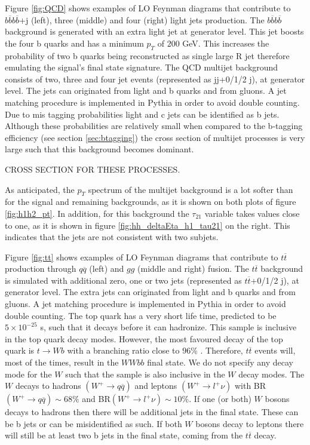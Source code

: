Figure \ref{fig:QCD} shows examples of LO Feynman diagrams that contribute to $b\overline{b}b\overline{b}$+j (left), three (middle) and four (right) light jets production. The $b\overline{b}b\overline{b}$ background is generated with an extra light jet at generator level. This jet boosts the four b quarks and has a minimum $p_T$ of $200$ GeV. This increases the probability of two b quarks being reconstructed as single large R jet therefore emulating the signal's final state signature. The QCD multijet background consists of two, three and four jet events (represented as jj+0/1/2 j), at generator level. The jets can originated from light and b quarks and from gluons. A jet matching procedure is implemented in Pythia in order to avoid double counting. Due to mis tagging probabilities light and c jets can be identified as b jets. Although these probabilities are relatively small when compared to the b-tagging efficiency (see section \ref{sec:btagging}) the cross section of multijet processes is very large such that this background becomes dominant.

CROSS SECTION FOR THESE PROCESSES.

As anticipated, the $p_T$ spectrum of the multijet background is a lot softer than for the signal and remaining backgrounds, as it is shown on both plots of figure \ref{fig:h1h2_pt}. In addition, for this background the $\tau_{21}$ variable takes values close to one, as it is shown in figure \ref{fig:hh_deltaEta_h1_tau21} on the right. This indicates that the jets are not consistent with two subjets. 

Figure \ref{fig:tt} shows examples of LO Feynman diagrams that contribute to $t\overline{t}$ production through $q\overline{q}$ (left) and $gg$ (middle and right) fusion. The $t\overline{t}$ background is simulated with additional zero, one or two jets (represented as $t\overline{t}$+0/1/2 j), at generator level. The extra jets can originated from light and b quarks and from gluons. A jet matching procedure is implemented in Pythia in order to avoid double counting. The top quark has a very short life time, predicted to be $5\times 10^{-25}$ s, such that it decays before it can hadronize. This sample is inclusive in the top quark decay modes. However, the most favoured decay of the top quark is $t\rightarrow Wb$ with a branching ratio close to $96\%$ \cite{PDG2016}. Therefore, $t\overline{t}$ events will, most of the times, result in the $WWbb$ final state. We do not specify any decay mode for the $W$ such that the sample is also inclusive in the $W$ decay modes. The $W$ decays to hadrons $(W^+\rightarrow q\overline{q})$ and leptons $(W^+\rightarrow l^+\nu)$ with BR$(W^+\rightarrow q\overline{q})\sim 68\%$ and BR$(W^+\rightarrow l^+\nu)\sim 10\%$. If one (or both) $W$ bosons decays to hadrons then there will be additional jets in the final state. These can be b jets or can be misidentified as such. If both $W$ bosons decay to leptons there will still be at least two b jets in the final state, coming from the $t\overline{t}$ decay.

